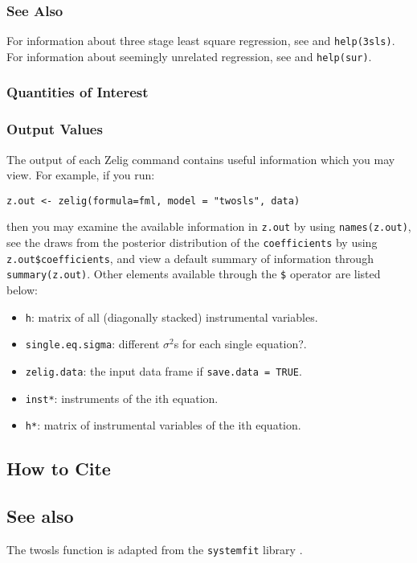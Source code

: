 \subsubsection{See Also}
For information about three stage least square regression, see 
 and \texttt{help(3sls)}.
For information about seemingly unrelated regression, see
 and \texttt{help(sur)}.
\subsubsection{Quantities of Interest}
\subsubsection{Output Values}
The output of each Zelig command contains useful information which you may
view. For example, if you run:
\begin{verbatim}
z.out <- zelig(formula=fml, model = "twosls", data)
\end{verbatim}
\noindent then you may examine the available information in \texttt{z.out} by
using \texttt{names(z.out)}, see the draws from the posterior distribution of
the \texttt{coefficients} by using \texttt{z.out\$coefficients}, and view a default
summary of information through \texttt{summary(z.out)}. Other elements
available through the \texttt{\$} operator are listed below:
\begin{itemize}
\item \texttt{h}: matrix of all (diagonally stacked) instrumental variables.
\item \texttt{single.eq.sigma}: different $\sigma^2$s for each single equation?.
   \item {\tt zelig.data}: the input data frame if {\tt save.data = TRUE}.  
\end{itemize}



\begin{itemize}
\item \texttt{inst*}: instruments of the ith equation.
\item \texttt{h*}: matrix of instrumental variables of the ith equation. 
\end{itemize}

\subsection* {How to Cite} 




\subsection* {See also}
The twosls function is adapted from the \texttt{systemfit} library
\citep{HamHen05}.

